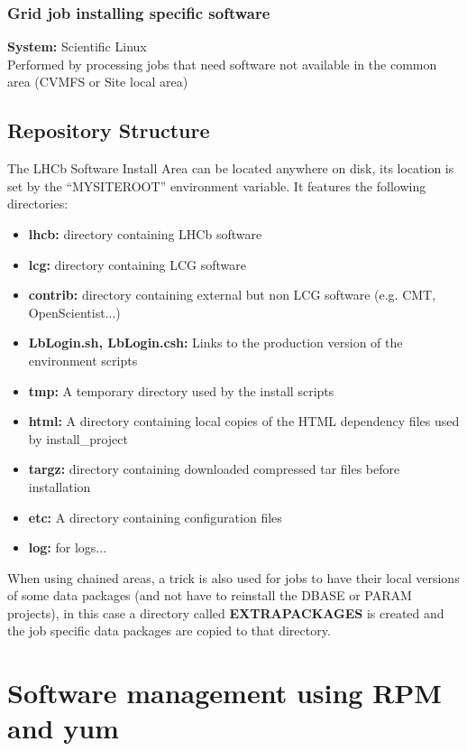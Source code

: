 \documentclass{lhcbnote}
\begin{document}
\subsubsection{Grid job installing specific software}
\textbf{System:} Scientific Linux\\
Performed by processing jobs that need software not available in the common area (CVMFS or Site local area)

\subsection{Repository Structure}

The LHCb Software Install Area can be located anywhere on disk, its location is set by the ``MYSITEROOT'' environment variable. It features the following directories:

\begin{itemize}
\item \textbf{lhcb:} directory containing LHCb software
\item \textbf{lcg:} directory containing LCG software
\item \textbf{contrib:} directory containing external but non LCG software (e.g. CMT, OpenScientist...)
\item \textbf{LbLogin.sh, LbLogin.csh:} Links to the production version of the environment scripts
\item \textbf{tmp:} A temporary directory used by the install scripts
\item \textbf{html:} A directory containing local copies of the HTML dependency files used by install\_project
\item \textbf{targz:} directory containing downloaded compressed tar files before installation
\item \textbf{etc:} A directory containing configuration files
\item \textbf{log:} for logs...
\end{itemize}

When using chained areas, a trick is also used for jobs to have their local versions of some data packages (and not have to reinstall the DBASE or PARAM projects), in this case a directory called \textbf{EXTRAPACKAGES} is created and the job specific data packages are copied to that directory.


\section{Software management using RPM and yum }
\end{document}
